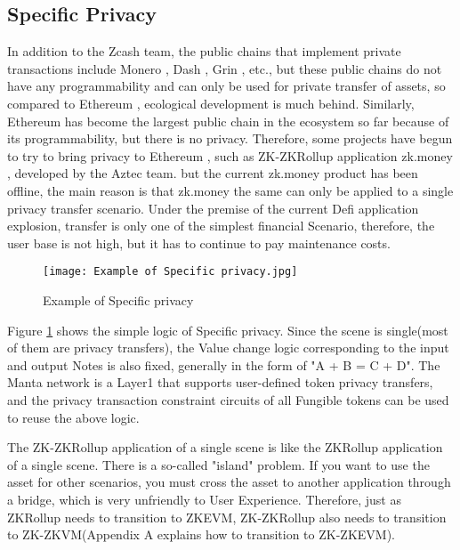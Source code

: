 \subsection{Specific Privacy}

In addition to the Zcash \cite{website:Zcash} team, the public chains that implement private transactions 
include Monero \cite{website:Monero}, Dash \cite{website:Dash}, Grin \cite{website:Grin}, etc., but these public chains do not have any 
programmability and can only be used for private transfer of assets, so compared to 
Ethereum \cite{website:Ethereum}, ecological development is much behind. Similarly, Ethereum \cite{website:Ethereum} has become 
the largest public chain in the ecosystem so far because of its programmability, 
but there is no privacy. Therefore, some projects have begun to try to bring privacy to 
Ethereum \cite{website:Ethereum}, such as ZK-ZKRollup application zk.money \cite{website:zk.money}, developed by the Aztec \cite{website:Aztec} team. 
but the current zk.money \cite{website:zk.money} product has been offline, the main reason is that zk.money \cite{website:zk.money}
the same can only be applied to a single privacy transfer scenario. Under the premise 
of the current Defi application explosion, transfer is only one of the simplest 
financial Scenario, therefore, the user base is not high, but it has to continue 
to pay maintenance costs.
\begin{figure}[!ht]
    \centering
    \texttt{[image: Example of Specific privacy.jpg]}
    \caption{Example of Specific privacy}
    \label{fig:Example of Specific privacy}
\end{figure}

Figure \ref{fig:Example of Specific privacy} shows the simple logic of Specific privacy. Since the scene is single(most of 
them are privacy transfers), the Value change logic corresponding to the input and output 
Notes is also fixed, generally in the form of "A + B = C + D". The Manta network \cite{website:Manta-network} is a 
Layer1 that supports user-defined token privacy transfers, and the privacy transaction 
constraint circuits of all Fungible tokens can be used to reuse the above logic.

The ZK-ZKRollup application of a single scene is like the ZKRollup application of a 
single scene. There is a so-called "island" problem. If you want to use the asset for 
other scenarios, you must cross the asset to another application through a bridge, 
which is very unfriendly to User Experience. Therefore, just as ZKRollup needs to 
transition to ZKEVM, ZK-ZKRollup also needs to transition to ZK-ZKVM(Appendix A explains 
how to transition to ZK-ZKEVM).